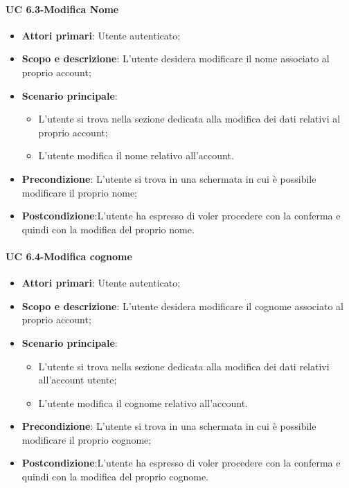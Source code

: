         \paragraph{UC 6.3-Modifica Nome}
            \begin{itemize}
                \item \textbf{Attori primari}: Utente autenticato;
                
                \item \textbf{Scopo e descrizione}: L'utente desidera modificare il nome associato al proprio account; 
                \item \textbf{Scenario principale}:
                    \begin{itemize}
                        \item L'utente si trova nella sezione dedicata alla modifica dei dati relativi al proprio account;
                        \item L'utente modifica il nome relativo all'account.
                    \end{itemize}
                \item \textbf{Precondizione}: L'utente si trova in una schermata in cui è possibile modificare il proprio nome;
                \item \textbf{Postcondizione}:L’utente ha espresso di voler procedere con la conferma e quindi
                con la modifica del proprio nome.
            \end{itemize}
            
            
        \paragraph{UC 6.4-Modifica cognome}
            \begin{itemize}
                \item \textbf{Attori primari}: Utente autenticato;
                
                \item \textbf{Scopo e descrizione}: L'utente desidera modificare il cognome associato al proprio account; 
                \item \textbf{Scenario principale}:
                    \begin{itemize}
                        \item L'utente si trova nella sezione dedicata alla modifica dei dati relativi all'account utente;
                        \item L'utente modifica il cognome relativo all'account.
                    \end{itemize}
               
                \item \textbf{Precondizione}: L'utente si trova in una schermata in cui è possibile modificare il proprio cognome;
                \item \textbf{Postcondizione}:L’utente ha espresso di voler procedere con la conferma e quindi
                con la modifica del proprio cognome.
            \end{itemize}
            
